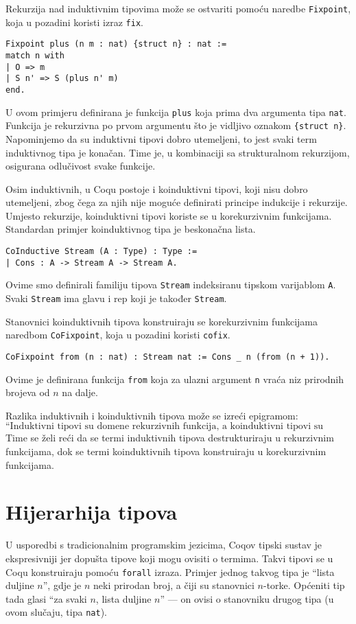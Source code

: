 Rekurzija nad induktivnim tipovima može se ostvariti pomoću naredbe \texttt{Fixpoint}, koja u pozadini koristi izraz \texttt{fix}.
\begin{verbatim}
Fixpoint plus (n m : nat) {struct n} : nat :=
match n with
| O => m
| S n' => S (plus n' m)
end.
\end{verbatim}
U ovom primjeru definirana je funkcija \texttt{plus} koja prima dva argumenta tipa \texttt{nat}.
Funkcija je rekurzivna po prvom argumentu što je vidljivo oznakom \texttt{\{struct n\}}.
Napominjemo da su induktivni tipovi dobro utemeljeni, to jest svaki term induktivnog tipa je konačan.
Time je, u kombinaciji sa strukturalnom rekurzijom, osigurana odlučivost svake funkcije.

Osim induktivnih, u Coqu postoje i koinduktivni tipovi, koji nisu dobro utemeljeni,
zbog čega za njih nije moguće definirati principe indukcije i rekurzije.
Umjesto rekurzije, koinduktivni tipovi koriste se u korekurzivnim funkcijama.
Standardan primjer koinduktivnog tipa je beskonačna lista.
\begin{verbatim}
CoInductive Stream (A : Type) : Type :=
| Cons : A -> Stream A -> Stream A.
\end{verbatim}
Ovime smo definirali familiju tipova \texttt{Stream} indeksiranu tipskom varijablom \texttt{A}.
Svaki \texttt{Stream} ima glavu i rep koji je također \texttt{Stream}.

Stanovnici koinduktivnih tipova konstruiraju se korekurzivnim funkcijama naredbom \texttt{CoFixpoint}, koja u pozadini koristi \texttt{cofix}.
\begin{verbatim}
CoFixpoint from (n : nat) : Stream nat := Cons _ n (from (n + 1)).
\end{verbatim}
Ovime je definirana funkcija \texttt{from} koja za ulazni argument \texttt{n} vraća niz prirodnih brojeva od \(n\) na dalje.

Razlika induktivnih i koinduktivnih tipova može se izreći epigramom:\\
\[
  \textrm{``Induktivni tipovi su domene rekurzivnih funkcija, a koinduktivni tipovi su kodomene korekurzivnih funkcija''.}
\]
\noindent Time se želi reći da se termi induktivnih tipova destrukturiraju u rekurzivnim funkcijama,
dok se termi koinduktivnih tipova konstruiraju u korekurzivnim funkcijama.


\section{Hijerarhija tipova}\label{sec:kumul-hijer-tipova}
U usporedbi s tradicionalnim programskim jezicima, Coqov tipski sustav je ekspresivniji jer dopušta tipove koji mogu ovisiti o termima.
Takvi tipovi se u Coqu konstruiraju pomoću \texttt{forall} izraza.
Primjer jednog takvog tipa je ``lista duljine \(n\)'', gdje je \(n\) neki prirodan broj, a čiji su stanovnici \(n\)-torke.
Općeniti tip tada glasi ``za svaki \(n\), lista duljine \(n\)'' --- on ovisi o stanovniku drugog tipa (u ovom slučaju, tipa \texttt{nat}).


